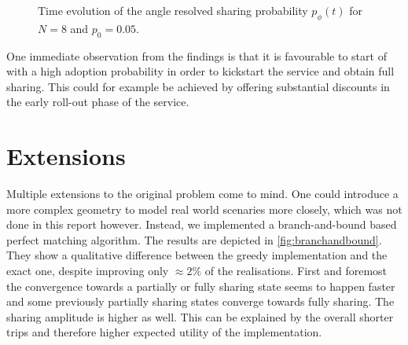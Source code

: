 \documentclass[aps,pra,showpacs,preprintnumbers,amsmath,amssymb,nofootinbib]{revtex4-2}
\begin{document}
\begin{figure}
{
        }
        \caption{Time evolution of the angle resolved sharing probability $p_\phi (t)$ for $N = 8$ and $p_0 = 0.05$.}
        \label{fig:time-evolution-n8-p0-005}
    \end{figure}

    One immediate observation from the findings is that it is favourable to start of with a high adoption probability in order to kickstart the service and obtain full sharing.
    This could for example be achieved by offering substantial discounts in the early roll-out phase of the service.


    \newpage
    \section{Extensions}
    \label{sec:extensions}
    
    Multiple extensions to the original problem come to mind. 
    One could introduce a more complex geometry to model real world scenaries more closely, which was not done in this report however.
    Instead, we implemented a branch-and-bound based perfect matching algorithm.
    The results are depicted in \cref{fig:branchandbound}.
    They show a qualitative difference between the greedy implementation and the exact one, despite improving only $\approx 2\%$ of the realisations.
    First and foremost the convergence towards a partially or fully sharing state seems to happen faster and some previously partially sharing states converge towards fully sharing.
    The sharing amplitude is higher as well.
    This can be explained by the overall shorter trips and therefore higher expected utility of the implementation.
    
\end{document}
